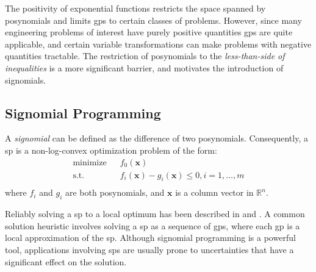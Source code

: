 The positivity of exponential functions restricts the space spanned by posynomials and limits
\gls{gp}s to certain classes of problems.
However, since many engineering problems of interest have purely positive quantities \gls{gp}s
are quite applicable, and certain variable transformations can make problems with negative quantities tractable.
The restriction of posynomials to the \emph{less-than-side of
inequalities} is a more significant barrier, and motivates the introduction of signomials.

\subsection{Signomial Programming}
\label{sec:sp}

A {\em signomial} can be defined as the difference of two posynomials. Consequently,
a \gls{sp} is a non-log-convex optimization problem of the form:
\begin{equation}
    \begin{split}
\text{minimize } &~~f_{0}(\mathbf{x}) \\
\text{s.t.} &~~f_{i}(\mathbf{x}) - g_{i}(\mathbf{x}) \leq 0, i = 1,\ldots, m \\
\end{split}
\end{equation}
where $f_{i}$ and $g_{i}$ are both posynomials, and $\mathbf{x}$ is a column vector in $\mathbb{R}^n$.

Reliably solving a \gls{sp} to a local optimum has been described in \cite{Boyd2007} and \cite{Lipp2016}.
A common solution heuristic involves solving a \gls{sp} as a sequence of \gls{gp}s,
where each \gls{gp} is a local approximation of the \gls{sp}.
Although signomial programming is a powerful tool, applications involving \gls{sp}s are usually prone
to uncertainties that have a significant effect on the solution.
